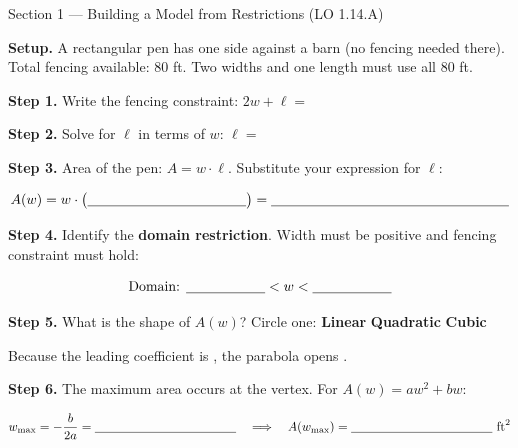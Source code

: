\documentclass[10pt]{article}
\begin{document}
\begin{notesbox}{Section 1 --- Building a Model from Restrictions (LO 1.14.A)}

\textbf{Setup.} A rectangular pen has one side against a barn (no fencing needed there).
Total fencing available: 80 ft. Two widths and one length must use all 80 ft.

\medskip
\textbf{Step 1.} Write the fencing constraint: \quad $2w + \ell = $ \blank{2cm}

\medskip
\textbf{Step 2.} Solve for $\ell$ in terms of $w$: \quad $\ell = $ \blank{4cm}

\medskip
\textbf{Step 3.} Area of the pen: $A = w \cdot \ell$.  Substitute your expression for $\ell$:

\[
  A(w) = w \cdot \bigl(\blank{4cm}\bigr) = \blank{6cm}
\]

\medskip
\textbf{Step 4.} Identify the \textbf{domain restriction}.
Width must be positive and fencing constraint must hold:

\[
  \text{Domain: } \blank{2cm} < w < \blank{2cm}
\]

\medskip
\textbf{Step 5.} What is the shape of $A(w)$? Circle one: \quad \textbf{Linear} \quad \textbf{Quadratic} \quad \textbf{Cubic}

Because the leading coefficient is \blank{2cm}, the parabola opens \blank{3cm}.

\medskip
\textbf{Step 6.} The maximum area occurs at the vertex. For $A(w) = aw^2 + bw$:

\[
  w_{\max} = -\dfrac{b}{2a} = \blank{4cm} \quad \Longrightarrow \quad A(w_{\max}) = \blank{4cm} \text{ ft}^2
\]


\end{notesbox}

\vspace{0.06in}
\end{document}
